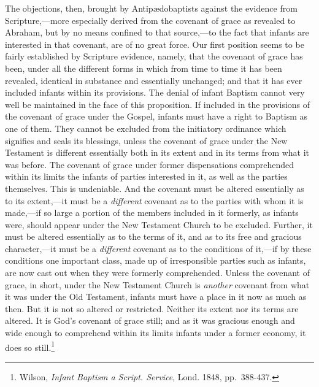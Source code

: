\documentclass[english,]{book}
\begin{document}
The objections, then, brought by Antipædobaptists against the evidence from Scripture,---more especially derived from the covenant of grace as revealed to Abraham, but by no means confined to that source,---to the fact that infants are interested in that covenant, are of no great force. Our first position seems to be fairly established by Scripture evidence, namely, that the covenant of grace has been, under all the different forms in which from time to time it has been revealed, identical in substance and essentially unchanged; and that it has ever included infants within its provisions. The denial of infant Baptism cannot very well be maintained in the face of this proposition. If included in the provisions of the covenant of grace under the Gospel, infants must have a right to Baptism as one of them. They cannot be excluded from the initiatory ordinance which signifies and seals its blessings, unless the covenant of grace under the New Testament is different essentially both in its extent and in its terms from what it was before. The covenant of grace under former dispensations comprehended within its limits the infants of parties interested in it, as well as the parties themselves. This is undeniable. And the covenant must be altered essentially as to its extent,---it must be a \emph{different} covenant as to the parties with whom it is made,---if so large a portion of the members included in it formerly, as infants were, should appear under the New Testament Church to be excluded. Further, it must be altered essentially as to the terms of it, and as to its free and gracious character,---it must be a \emph{different} covenant as to the conditions of it,---if by these conditions one important class, made up of irresponsible parties such as infants, are now cast out when they were formerly comprehended. Unless the covenant of grace, in short, under the New Testament Church is \emph{another} covenant from what it was under the Old Testament, infants must have a place in it now as much as then. But it is not so altered or restricted. Neither its extent nor its terms are altered. It is God's covenant of grace still; and as it was gracious enough and wide enough to comprehend within its limits infants under a former economy, it does so still.\footnote{Wilson, \emph{Infant Baptism a Script. Service}, Lond. 1848, pp.~388-437.}
\end{document}
